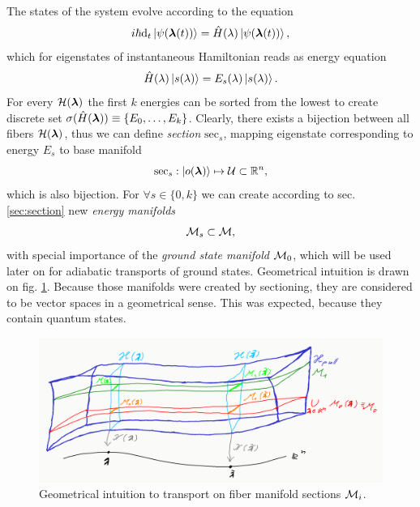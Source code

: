 The states of the system evolve according to the \Schrodinger equation
\begin{equation}
    i\hbar \mathrm{d}_t\ket{\psi({\bm\lambda}(t))} = \hat{H}(\lambda)\ket{\psi({\bm\lambda}(t))},
    \label{eq:schrodinger}
\end{equation}
which for eigenstates of instantaneous Hamiltonian reads as energy \Schrodinger equation
\begin{equation}
    \hat{H}(\lambda)\ket{s(\lambda)}=E_s(\lambda)\ket{s(\lambda)}.
    \label{eq:energySchrodinger}
\end{equation}
For every $\mathcal{H}({\bm\lambda})$ the first $k$ energies can be sorted from the lowest to create discrete set $\sigma(\hat{H}({\bm\lambda}))\equiv\{E_0,\dots,E_k\}$. Clearly, there exists a bijection between all fibers $\mathcal{H}({\bm\lambda})$, thus we can define \emph{section} $\mathrm{sec}_s$, mapping eigenstate corresponding to energy $E_s$ to base manifold 
$$\mathrm{sec}_s: \ket{o({\bm\lambda})}\mapsto \mathcal{U}\subset \mathbb{R}^n,$$
which is also bijection. For $\forall s\in\{0,k\}$ we can create according to sec. \ref{sec:section} new \emph{energy manifolds}
$$\mathcal{M}_s\subset \mathcal{M},$$
with special importance of the \emph{ground state manifold} $\mathcal{M}_0$, which will be used later on for adiabatic transports of ground states. Geometrical intuition is drawn on fig. \ref{fig:fullStructure}. Because those manifolds were created by sectioning, they are considered to be vector spaces in a geometrical sense. This was expected, because they contain quantum states.

\begin{figure}[h]
    \centering
    \includegraphics[width=\textwidth]{../img/manifold_full.png}
\caption{Geometrical intuition to transport on fiber manifold sections $\mathcal{M}_i$.}
    \label{fig:fullStructure}
\end{figure}





